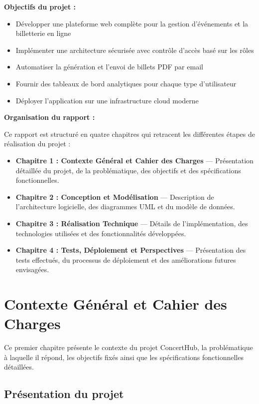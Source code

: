 \documentclass[a4paper,12pt,twoside]{report}
\begin{document}
\textbf{Objectifs du projet :}
\begin{itemize}
    \item Développer une plateforme web complète pour la gestion d'événements et la billetterie en ligne
    \item Implémenter une architecture sécurisée avec contrôle d'accès basé sur les rôles
    \item Automatiser la génération et l'envoi de billets PDF par email
    \item Fournir des tableaux de bord analytiques pour chaque type d'utilisateur
    \item Déployer l'application sur une infrastructure cloud moderne
\end{itemize}

\textbf{Organisation du rapport :}

Ce rapport est structuré en quatre chapitres qui retracent les différentes étapes de réalisation du projet :

\begin{itemize}
    \item \textbf{Chapitre 1 : Contexte Général et Cahier des Charges} --- Présentation détaillée du projet, de la problématique, des objectifs et des spécifications fonctionnelles.
    \item \textbf{Chapitre 2 : Conception et Modélisation} --- Description de l'architecture logicielle, des diagrammes UML et du modèle de données.
    \item \textbf{Chapitre 3 : Réalisation Technique} --- Détails de l'implémentation, des technologies utilisées et des fonctionnalités développées.
    \item \textbf{Chapitre 4 : Tests, Déploiement et Perspectives} --- Présentation des tests effectués, du processus de déploiement et des améliorations futures envisagées.
\end{itemize}

\chapter{Contexte Général et Cahier des Charges}
\thispagestyle{empty}

Ce premier chapitre présente le contexte du projet ConcertHub, la problématique à laquelle il répond, les objectifs fixés ainsi que les spécifications fonctionnelles détaillées.

\section{Présentation du projet}
\end{document}
